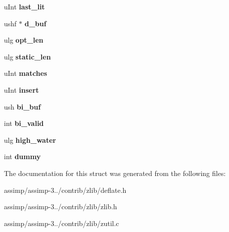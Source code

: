 \begin{DoxyCompactItemize}
\item 
\hypertarget{structinternal__state_a01689001a8f8c7dfa46a439b7ae0708a}{u\+Int {\bfseries last\+\_\+lit}}\label{structinternal__state_a01689001a8f8c7dfa46a439b7ae0708a}

\item 
\hypertarget{structinternal__state_a077ab4b44be78377e41b51a886e0dd56}{ushf $\ast$ {\bfseries d\+\_\+buf}}\label{structinternal__state_a077ab4b44be78377e41b51a886e0dd56}

\item 
\hypertarget{structinternal__state_a2f6efee5d2057aba8bca2c1a58cf418a}{ulg {\bfseries opt\+\_\+len}}\label{structinternal__state_a2f6efee5d2057aba8bca2c1a58cf418a}

\item 
\hypertarget{structinternal__state_a8a83e269866761afa3a7b4641ba5ff91}{ulg {\bfseries static\+\_\+len}}\label{structinternal__state_a8a83e269866761afa3a7b4641ba5ff91}

\item 
\hypertarget{structinternal__state_ac0f10ec7237615f6b632f2f4d14872ef}{u\+Int {\bfseries matches}}\label{structinternal__state_ac0f10ec7237615f6b632f2f4d14872ef}

\item 
\hypertarget{structinternal__state_a315b7281f725e5729fbbafada48fc70a}{u\+Int {\bfseries insert}}\label{structinternal__state_a315b7281f725e5729fbbafada48fc70a}

\item 
\hypertarget{structinternal__state_a6880946d081053778f5f544b04603d13}{ush {\bfseries bi\+\_\+buf}}\label{structinternal__state_a6880946d081053778f5f544b04603d13}

\item 
\hypertarget{structinternal__state_a241f3606e41a3aa0ef22868a41bd9a0f}{int {\bfseries bi\+\_\+valid}}\label{structinternal__state_a241f3606e41a3aa0ef22868a41bd9a0f}

\item 
\hypertarget{structinternal__state_a85439cd585435b2590039339139d25cb}{ulg {\bfseries high\+\_\+water}}\label{structinternal__state_a85439cd585435b2590039339139d25cb}

\item 
\hypertarget{structinternal__state_ab000a3e3c901dd063859521988ad7e52}{int {\bfseries dummy}}\label{structinternal__state_ab000a3e3c901dd063859521988ad7e52}

\end{DoxyCompactItemize}


The documentation for this struct was generated from the following files\+:\begin{DoxyCompactItemize}
\item 
assimp/assimp-\/3../contrib/zlib/deflate.\+h\item 
assimp/assimp-\/3../contrib/zlib/zlib.\+h\item 
assimp/assimp-\/3../contrib/zlib/zutil.\+c\end{DoxyCompactItemize}
